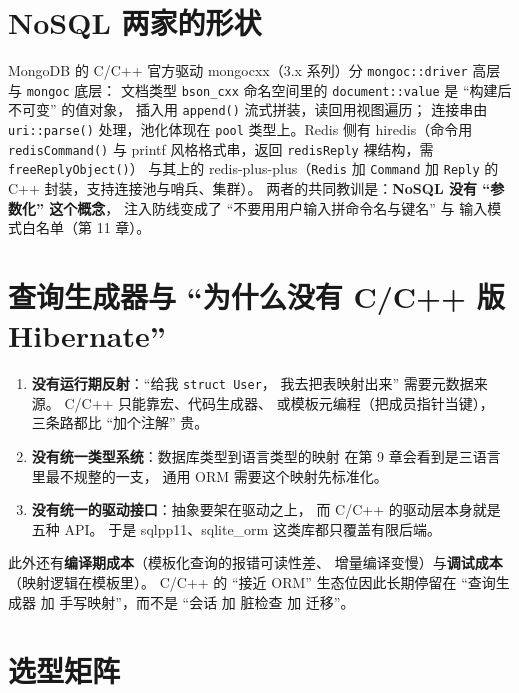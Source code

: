 \documentclass[12pt,a4paper,fontset=fandol]{ctexbook}
\newcommand{\Fn}[1]{\texttt{#1()}}
\newcommand{\Tp}[1]{\texttt{#1}}
\newcommand{\CppJava}{C/C++}
\begin{document}
\section{NoSQL 两家的形状}

MongoDB 的 \CppJava{} 官方驱动 mongocxx（3.x 系列）分
\Tp{mongoc::driver} 高层与 \Tp{mongoc} 底层：
文档类型 \Tp{bson\_cxx} 命名空间里的 \Tp{document::value} 是 ``构建后不可变'' 的值对象，
插入用 \Fn{append} 流式拼装，读回用视图遍历；
连接串由 \Fn{uri::parse} 处理，池化体现在
\Tp{pool} 类型上。Redis 侧有 hiredis（命令用
\Fn{redisCommand} 与 printf 风格格式串，返回
\Tp{redisReply} 裸结构，需 \Fn{freeReplyObject}）
与其上的 redis-plus-plus（\Tp{Redis} 加 \Tp{Command} 加
\Tp{Reply} 的 C++ 封装，支持连接池与哨兵、集群）。
两者的共同教训是：\textbf{NoSQL 没有 ``参数化'' 这个概念}，
注入防线变成了 ``不要用用户输入拼命令名与键名'' 与
输入模式白名单（第 11 章）。

\section{查询生成器与 ``为什么没有 \CppJava{} 版 Hibernate''}

\begin{warning}[title=三个结构性缺失]
\begin{enumerate}
  \item \textbf{没有运行期反射}：``给我 \Tp{struct User}，
        我去把表映射出来'' 需要元数据来源。
        \CppJava{} 只能靠宏、代码生成器、
        或模板元编程（把成员指针当键），
        三条路都比 ``加个注解'' 贵。
  \item \textbf{没有统一类型系统}：数据库类型到语言类型的映射
        在第 9 章会看到是三语言里最不规整的一支，
        通用 ORM 需要这个映射先标准化。
  \item \textbf{没有统一的驱动接口}：抽象要架在驱动之上，
        而 \CppJava{} 的驱动层本身就是五种 API。
        于是 sqlpp11、sqlite\_orm 这类库都只覆盖有限后端。
\end{enumerate}
此外还有\textbf{编译期成本}（模板化查询的报错可读性差、
增量编译变慢）与\textbf{调试成本}（映射逻辑在模板里）。
\CppJava{} 的 ``接近 ORM'' 生态位因此长期停留在
``查询生成器 加 手写映射''，而不是 ``会话 加 脏检查 加 迁移''。
\end{warning}

\section{选型矩阵}
\end{document}

